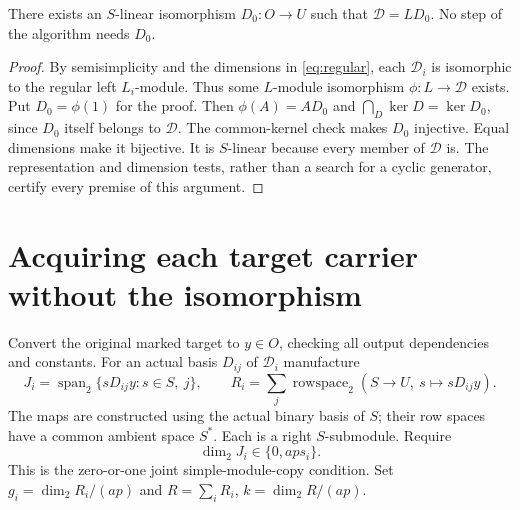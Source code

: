 \documentclass[11pt]{article}
\begin{document}
\begin{lemma}
There exists an $S$-linear isomorphism $D_0:O\to U$ such that
$\mathcal D=LD_0$. No step of the algorithm needs $D_0$.
\end{lemma}
\begin{proof}
By semisimplicity and the dimensions in \eqref{eq:regular}, each
$\mathcal D_i$ is isomorphic to the regular left $L_i$-module.
Thus some $L$-module isomorphism $\phi:L\to\mathcal D$ exists.
Put $D_0=\phi(1)$ for the proof. Then $\phi(A)=AD_0$ and
$\bigcap_D\ker D=\ker D_0$, since $D_0$ itself belongs to $\mathcal D$.
The common-kernel check makes $D_0$ injective. Equal dimensions make it
bijective. It is $S$-linear because every member of $\mathcal D$ is.
The representation and dimension tests, rather than a search for a cyclic
generator, certify every premise of this argument.
\end{proof}

\section{Acquiring each target carrier without the isomorphism}
Convert the original marked target to $y\in O$, checking all output
dependencies and constants. For an actual basis $D_{ij}$ of $\mathcal D_i$
manufacture
\[
 J_i=\operatorname{span}_2\{sD_{ij}y:s\in S,\ j\},
 \qquad
 R_i=\sum_j\operatorname{rowspace}_2(S\to U,\ s\mapsto sD_{ij}y).
\]
The maps are constructed using the actual binary basis of $S$; their row
spaces have a common ambient space $S^*$. Each is a right $S$-submodule.
Require
\[
 \dim_2J_i\in\{0,ap s_i\}.
\]
This is the zero-or-one joint simple-module-copy condition. Set
$g_i=\dim_2R_i/(ap)$ and $R=\sum_iR_i$, $k=\dim_2R/(ap)$.
\end{document}

